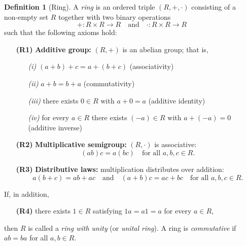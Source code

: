 \documentclass[12pt]{article}
\title{}
\author{Jerich Lee}
\date{\today}
\theoremstyle{definition} %
\newtheorem{definition}{Definition}
\theoremstyle{plain} %
\begin{document}
\maketitle
\begin{definition}[Ring]
  A \emph{ring} is an ordered triple $(R,+,\cdot)$ consisting of a non‑empty set $R$ together with two binary operations
  \[
  +\colon R\times R\to R
  \quad\text{and}\quad
  \cdot\colon R\times R\to R
  \]
  such that the following axioms hold:
  
  \begin{enumerate}
    \item[\textbf{(R1)}] \textbf{Additive group:} $(R,+)$ is an abelian group; that is,
      \begin{enumerate}
        \item[\textit{(i)}] $(a+b)+c = a+(b+c)$ \hfill(associativity)
        \item[\textit{(ii)}] $a+b = b+a$ \hfill(commutativity)
        \item[\textit{(iii)}] there exists $0\in R$ with $a+0 = a$ \hfill(additive identity)
        \item[\textit{(iv)}] for every $a\in R$ there exists $(-a)\in R$ with $a+(-a)=0$ \hfill(additive inverse)
      \end{enumerate}
  
    \item[\textbf{(R2)}] \textbf{Multiplicative semigroup:} $(R,\cdot)$ is associative:
      \[
        (ab)c = a(bc)\quad\text{for all }a,b,c\in R.
      \]
  
    \item[\textbf{(R3)}] \textbf{Distributive laws:} multiplication distributes over addition:
      \[
        a(b+c) = ab+ac
        \quad\text{and}\quad
        (a+b)c = ac+bc
        \quad\text{for all }a,b,c\in R.
      \]
  \end{enumerate}
  If, in addition,
  
  \begin{enumerate}
    \item[\textbf{(R4)}] there exists $1\in R$ satisfying $1a=a1=a$ for every $a\in R$,
  \end{enumerate}
  then $R$ is called a \emph{ring with unity} (or \emph{unital ring}).  
  A ring is \emph{commutative} if $ab=ba$ for all $a,b\in R$.
  \end{definition}
\end{document}
